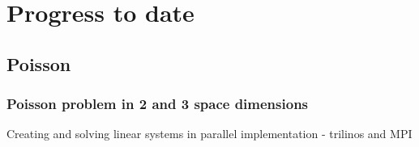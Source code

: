 \documentclass{beamer}
\begin{document}
\section[Progress]{Progress to date}

\subsection{Poisson}
\begin{frame}[shrink=20]%
\frametitle{Poisson problem in 2 and 3 space dimensions}
\scriptsize
\begin{minipage}[t][1\textheight]{1\textwidth}
\vspace{-20pt}
\begin{exampleblock}{Creating and solving linear systems in parallel implementation - trilinos and MPI}
\vspace{-20pt}
\begin{figure}
\label{fig:Poisson}
\centering
{}

\end{figure}
\end{exampleblock}
\end{minipage}
\end{frame}
\end{document}
